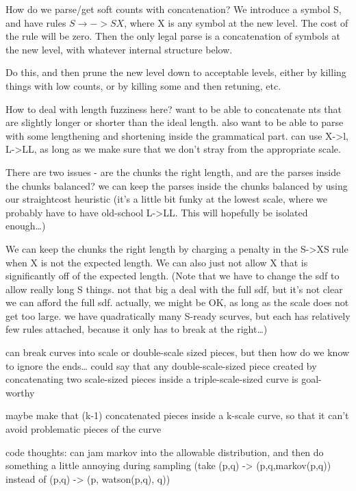 \documentclass{book}
\begin{document}
\begin{itemize}
    How do we parse/get soft counts with concatenation? We introduce a
    symbol S, and have rules $S \to -> SX$, where X is any symbol at the new
    level. The cost of the rule will be zero. Then the only legal
    parse is a concatenation of symbols at the new level, with
    whatever internal structure below.

    Do this, and then prune the new level down to acceptable levels,
    either by killing things with low counts, or by killing some and
    then retuning, etc.

    How to deal with length fuzziness here? want to be able to
    concatenate nts that are slightly longer or shorter than the ideal
    length. also want to be able to parse with some lengthening and
    shortening inside the grammatical part. can use X->l, L->LL, as
    long as we make sure that we don't stray from the appropriate
    scale.

    There are two issues - are the chunks the right length, and are
    the parses inside the chunks balanced? we can keep the parses
    inside the chunks balanced by using our straightcost heuristic
    (it's a little bit funky at the lowest scale, where we probably
    have to have old-school L->LL. This will hopefully be isolated
    enough\ldots{})

    We can keep the chunks the right length by charging a penalty in
    the S->XS rule when X is not the expected length. We can also just
    not allow X that is significantly off of the expected
    length. (Note that we have to change the sdf to allow really long
    S things. not that big a deal with the full sdf, but it's not
    clear we can afford the full sdf. actually, we might be OK, as
    long as the scale does not get too large. we have quadratically
    many S-ready scurves, but each has relatively few rules attached,
    because it only has to break at the right\ldots{})

    can break curves into scale or double-scale sized pieces, but then
    how do we know to ignore the ends\ldots{} could say that any
    double-scale-sized piece created by concatenating two scale-sized
    pieces inside a triple-scale-sized curve is goal-worthy

    maybe make that (k-1) concatenated pieces inside a k-scale curve,
    so that it can't avoid problematic pieces of the curve

    code thoughts: can jam markov into the allowable distribution, and
    then do something a little annoying during sampling (take (p,q) ->
    (p,q,markov(p,q)) instead of (p,q) -> (p, watson(p,q), q))
\end{itemize}
\end{document}
